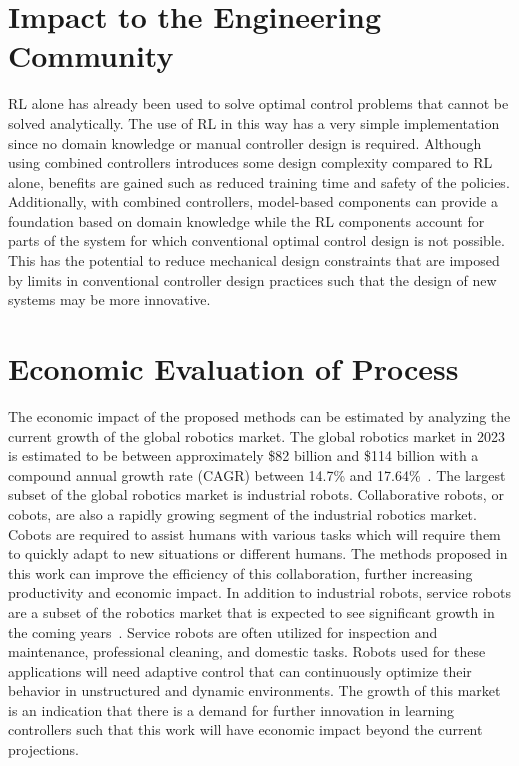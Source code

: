\section{Impact to the Engineering Community}
%
RL alone has already been used to solve optimal control problems that cannot be solved analytically. The use of RL in this way has a very simple implementation since no domain knowledge or manual controller design is required. Although using combined controllers introduces some design complexity compared to RL alone, benefits are gained such as reduced training time and safety of the policies. Additionally, with combined controllers, model-based components can provide a foundation based on domain knowledge while the RL components account for parts of the system for which conventional optimal control design is not possible. This has the potential to reduce mechanical design constraints that are imposed by limits in conventional controller design practices such that the design of new systems may be more innovative.
%

\section{Economic Evaluation of Process}
%
The economic impact of the proposed methods can be estimated by analyzing the current growth of the global robotics market. The global robotics market in 2023 is estimated to be between approximately \$82 billion and \$114 billion with a compound annual growth rate (CAGR) between 14.7\% and 17.64\%~\cite{RoboMarket:2023a,RoboMarket:2023b}. The largest subset of the global robotics market is industrial robots. Collaborative robots, or cobots, are also a rapidly growing segment of the industrial robotics market. Cobots are required to assist humans with various tasks which will require them to quickly adapt to new situations or different humans. The methods proposed in this work can improve the efficiency of this collaboration, further increasing productivity and economic impact.
%
In addition to industrial robots, service robots are a subset of the robotics market that is expected to see significant growth in the coming years~\cite{RoboMarket:2023a}. Service robots are often utilized for inspection and maintenance, professional cleaning, and domestic tasks. Robots used for these applications will need adaptive control that can continuously optimize their behavior in unstructured and dynamic environments. The growth of this market is an indication that there is a demand for further innovation in learning controllers such that this work will have economic impact beyond the current projections.

